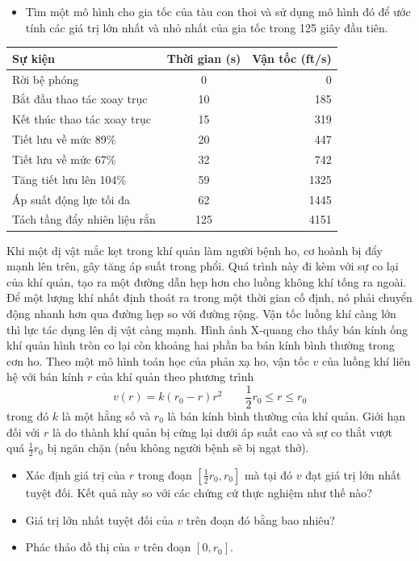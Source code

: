 \hfill
\begin{minipage}[t]{0.482\textwidth}
\begin{itemize}
  \setlength{\itemsep}{0pt}%
  \setlength{\topsep}{0pt}%
  \setlength{\leftmargin}{1.5em}%
  \item[(b)] Tìm một mô hình cho gia tốc của tàu con thoi và sử dụng mô hình đó để ước tính các giá trị lớn nhất và nhỏ nhất của gia tốc trong 125 giây đầu tiên.
\end{itemize}

\vspace{2pt}
\noindent
\renewcommand{\arraystretch}{1.12}
\small
\begin{tabularx}{\linewidth}{Xcr}
\hline
\rowcolor{tableblue}
\textbf{Sự kiện} & \textbf{Thời gian (s)} & \textbf{Vận tốc (ft/s)} \\
\hline
Rời bệ phóng & 0 & 0 \\
Bắt đầu thao tác xoay trục & 10 & 185 \\
Kết thúc thao tác xoay trục & 15 & 319 \\
Tiết lưu về mức 89\% & 20 & 447 \\
Tiết lưu về mức 67\% & 32 & 742 \\
Tăng tiết lưu lên 104\% & 59 & 1325 \\
Áp suất động lực tối đa & 62 & 1445 \\
Tách tầng đẩy nhiên liệu rắn & 125 & 4151 \\
\hline
\end{tabularx}

 Khi một dị vật mắc kẹt trong khí quản làm người bệnh ho, cơ hoành bị đẩy mạnh lên trên, gây tăng áp suất trong phổi. Quá trình này đi kèm với sự co lại của khí quản, tạo ra một đường dẫn hẹp hơn cho luồng không khí tống ra ngoài. Để một lượng khí nhất định thoát ra trong một thời gian cố định, nó phải chuyển động nhanh hơn qua đường hẹp so với đường rộng. Vận tốc luồng khí càng lớn thì lực tác dụng lên dị vật càng mạnh. Hình ảnh X-quang cho thấy bán kính ống khí quản hình tròn co lại còn khoảng hai phần ba bán kính bình thường trong cơn ho. Theo một mô hình toán học của phản xạ ho, vận tốc $v$ của luồng khí liên hệ với bán kính $r$ của khí quản theo phương trình
\[
v(r) = k(r_0 - r)r^2 \qquad \frac{1}{2}r_0 \leqslant r \leqslant r_0
\]
trong đó $k$ là một hằng số và $r_0$ là bán kính bình thường của khí quản. Giới hạn đối với $r$ là do thành khí quản bị cứng lại dưới áp suất cao và sự co thắt vượt quá $\frac{1}{2}r_0$ bị ngăn chặn (nếu không người bệnh sẽ bị ngạt thở).
\begin{itemize}
  \setlength{\itemsep}{1pt}%
  \setlength{\topsep}{2pt}%
  \setlength{\leftmargin}{1.5em}%
  \item[(a)] Xác định giá trị của $r$ trong đoạn $\left[\frac{1}{2}r_0, r_0\right]$ mà tại đó $v$ đạt giá trị lớn nhất tuyệt đối. Kết quả này so với các chứng cứ thực nghiệm như thế nào?
  \item[(b)] Giá trị lớn nhất tuyệt đối của $v$ trên đoạn đó bằng bao nhiêu?
  \item[(c)] Phác thảo đồ thị của $v$ trên đoạn $[0, r_0]$.
\end{itemize}


\end{minipage}
